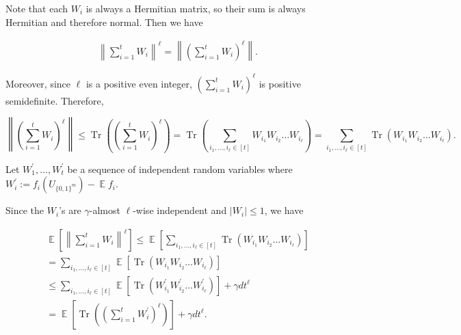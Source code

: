 \documentclass[10pt,a4paper]{article}
\begin{document}
Note that each $W_{i}$ is always a Hermitian matrix, so their sum is always Hermitian and therefore normal. Then we have\par


\[\begin{gathered}
\left\lVert\sum_{i=1}^{t}W_{i}\right\rVert^{\ell}=\left\lVert\left(\sum_{i=1}^{t}W_{i}\right)^{\ell}\right\rVert.
\end{gathered}\]


Moreover, since $\ell$ is a positive even integer, $(\sum_{i=1}^{t}W_{i})^{\ell}$ is positive semidefinite. Therefore,







\[\left\lVert\left(\sum_{i=1}^{t}W_{i}\right)^{\ell}\right\rVert\leq\operatorname*{Tr}\left(\left(\sum_{i=1}^{t}W_{i}\right)^{\ell}\right)=\operatorname*{Tr}\left(\sum_{i_{1},\dots,i_{\ell}\in[t]}W_{i_{1}}W_{i_{2}}\dots W_{i_{\ell}}\right)=\sum_{i_{1},\dots,i_{\ell}\in[t]}\operatorname*{Tr}\left(W_{i_{1}}W_{i_{2}}\dots W_{i_{\ell}}\right).\]



\par




Let $W_{1}^{\prime},\dots,W_{t}^{\prime}$ be a sequence of independent random variables where $W_{i}^{\prime}:=f_{i}(U_{\{0,1\}^{m}})-\operatorname*{\mathbb{E}}f_{i}$.\par




Since the $W_{i}$’s are $\gamma$-almost $\ell$-wise independent and $|W_{i}|\leq 1$, we have\par


\[\begin{gathered}
\displaystyle\operatorname*{\mathbb{E}}\left[\left\lVert\sum_{i=1}^{t}W_{i}\right\rVert^{\ell}\right] \displaystyle\leq\operatorname*{\mathbb{E}}\left[\sum_{i_{1},\dots,i_{\ell}\in[t]}\operatorname*{Tr}\left(W_{i_{1}}W_{i_{2}}\dots W_{i_{\ell}}\right)\right] \\
\displaystyle=\sum_{i_{1},\dots,i_{\ell}\in[t]}\operatorname*{\mathbb{E}}\left[\operatorname*{Tr}\left(W_{i_{1}}W_{i_{2}}\dots W_{i_{\ell}}\right)\right] \\
\displaystyle\leq\sum_{i_{1},\dots,i_{\ell}\in[t]}\operatorname*{\mathbb{E}}\left[\operatorname*{Tr}\left(W_{i_{1}}^{\prime}W_{i_{2}}^{\prime}\dots W_{i_{\ell}}^{\prime}\right)\right]+\gamma dt^{\ell} \\
\displaystyle=\operatorname*{\mathbb{E}}\left[\operatorname*{Tr}\left(\left(\sum_{i=1}^{t}W_{i}^{\prime}\right)^{\ell}\right)\right]+\gamma dt^{\ell}.
\end{gathered}\]
\end{document}
